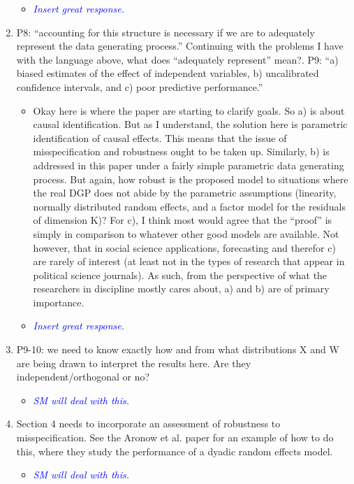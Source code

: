 \begin{enumerate}
\begin{itemize}
	\end{itemize}
	\begin{itemize}
		\item \textcolor{blue}{ \emph{
		Insert great response.
		}}
	\end{itemize}
	\item P8: “accounting for this structure is necessary if we are to adequately represent the data generating process.” Continuing with the problems I have with the language above, what does “adequately represent” mean?. P9: “a) biased estimates of the effect of independent variables, b) uncalibrated confidence intervals, and c) poor predictive performance.”
	\begin{itemize}
		\item Okay here is where the paper are starting to clarify goals.  So a) is about causal identification.  But as I understand, the solution here is parametric identification of causal effects.  This means that the issue of misspecification and robustness ought to be taken up.  Similarly, b) is addressed in this paper under a fairly simple parametric data generating process. But again, how robust is the proposed model to situations where the real DGP does not abide by the parametric assumptions (linearity, normally distributed random effects, and a factor model for the residuals of dimension K)? For c), I think most would agree that the “proof” is simply in comparison to whatever other good models are available.  Not however, that in social science applications, forecasting and therefor c) are rarely of interest (at least not in the types of research that appear in political science journals).  As such, from the perspective of what the researchers in discipline mostly cares about, a) and b) are of primary importance.
	\end{itemize}
	\begin{itemize}
		\item \textcolor{blue}{ \emph{
		Insert great response.
		}}
	\end{itemize}
	\item P9-10: we need to know exactly how and from what distributions X and W are being drawn to interpret the results here.  Are they independent/orthogonal or no?
	\begin{itemize}
		\item \textcolor{blue}{ \emph{
		SM will deal with this.
		}}
	\end{itemize}
	\item Section 4 needs to incorporate an assessment of robustness to misspecification.  See the Aronow et al. paper for an example of how to do this, where they study the performance of a dyadic random effects model.
	\begin{itemize}
		\item \textcolor{blue}{ \emph{
		SM will deal with this.
		}}
	\end{itemize}
\end{enumerate}
